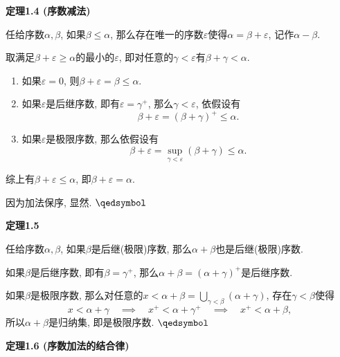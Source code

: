 \documentclass[UTF8]{ctexart}
\begin{document}
\newpage

\hypertarget{sec:定理1.4}{}
\noindent\textbf{定理1.4 (序数减法)}

任给序数$\alpha,\beta$, 如果$\beta\leqslant\alpha$,
那么存在唯一的序数$\varepsilon$使得$\alpha=\beta+\varepsilon$, 记作$\alpha-\beta$.



取满足$\beta+\varepsilon\geqslant\alpha$的最小的$\varepsilon$,
即对任意的$\gamma<\varepsilon$有$\beta+\gamma<\alpha$.

\begin{enumerate}
    \item 如果$\varepsilon=0$, 则$\beta+\varepsilon=\beta\leqslant\alpha$.
    \item 如果$\varepsilon$是后继序数, 即有$\varepsilon=\gamma^+$,
    那么$\gamma<\varepsilon$, 依假设有
    \[
        \beta+\varepsilon=(\beta+\gamma)^+\leqslant\alpha.
    \]
    \item 如果$\varepsilon$是极限序数, 那么依假设有
    \[
        \beta+\varepsilon=\sup_{\gamma<\varepsilon}(\beta+\gamma)\leqslant\alpha.
    \]
\end{enumerate}
综上有$\beta+\varepsilon\leqslant\alpha$, 即$\beta+\varepsilon=\alpha$.

 因为加法保序, 显然. \hfill $\qedsymbol$

\vspace{10pt}

\hypertarget{sec:定理1.5}{}
\noindent\textbf{定理1.5}

任给序数$\alpha,\beta$, 如果$\beta$是后继(极限)序数,
那么$\alpha+\beta$也是后继(极限)序数.


如果$\beta$是后继序数, 即有$\beta=\gamma^+$,
那么$\alpha+\beta=(\alpha+\gamma)^+$是后继序数.

\vspace{3pt}
如果$\beta$是极限序数,
那么对任意的$\displaystyle x<\alpha+\beta=\bigcup_{\gamma<\beta}(\alpha+\gamma)$,
存在$\gamma<\beta$使得
\vspace{3pt}
\[
    x<\alpha+\gamma\quad\implies\quad x^+<\alpha+\gamma^+
    \quad\implies\quad x^+<\alpha+\beta,
\]
所以$\alpha+\beta$是归纳集, 即是极限序数. \hfill $\qedsymbol$

\vspace{10pt}

\hypertarget{sec:定理1.6}{}
\noindent\textbf{定理1.6 (序数加法的结合律)}
\end{document}
